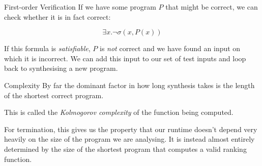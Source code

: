 \documentclass[xcolor=pdftex,t,11pt]{beamer}
\begin{document}
\begin{frame}{First-order Verification}
 If we have some program $P$ that might be correct, we can check whether it is in fact correct:
 
 $$\exists x . \lnot \sigma(x, P(x))$$
 
 If this formula is \emph{satisfiable}, $P$ is \emph{not} correct and we have found an input on which it is incorrect.
 We can add this input to our set of test inputs and loop back to synthesising a new program.
\end{frame}

\iffalse
\begin{frame}{Concrete Synthesis in C}
 We're using C as an implementation language.  To do that we need:
 
 \begin{itemize}
  \item A way of encoding programs as \emph{finite structures} in C.
  \item A way of encoding the first-order synthesis and verification formulae in C.
  \item A way of checking properties of C programs.
 \end{itemize}
\end{frame}

\begin{frame}[fragile]{Encoding Programs in C}
 To encode the programs we will synthesise, we just make a very simple language and an interpreter for it.  Programs
 in our language look like this:

 \vspace{0.7cm}

\begin{center}
\begin{minipage}{0.3\linewidth}
\begin{verbatimtab}
t1 = neg x
t2 = add t1 1
return t2
\end{verbatimtab}
\end{minipage}
\end{center}

\end{frame}

\fi

\begin{frame}{Complexity}
By far the dominant factor in how long synthesis takes is the length of the shortest correct program.

\vspace{1em}

This is called the \emph{Kolmogorov complexity} of the function being computed.

\vspace{1em}

For termination, this gives us the property that our runtime doesn't depend very heavily
on the size of the program we are analysing.  It is instead almost entirely determined by the
size of the shortest program that computes a valid ranking function.
\end{frame}
\end{document}
